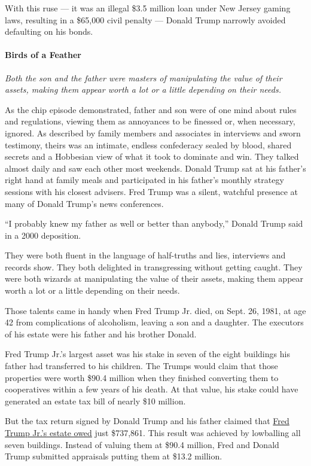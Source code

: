 With this ruse --- it was an illegal \$3.5 million loan under New Jersey
gaming laws, resulting in a \$65,000 civil penalty --- Donald Trump
narrowly avoided defaulting on his bonds.

\hypertarget{birds-of-a-feather}{%
\paragraph{Birds of a Feather}\label{birds-of-a-feather}}

\emph{Both the son and the father were masters of manipulating the value
of their assets, making them appear worth a lot or a little depending on
their needs.}

As the chip episode demonstrated, father and son were of one mind about
rules and regulations, viewing them as annoyances to be finessed or,
when necessary, ignored. As described by family members and associates
in interviews and sworn testimony, theirs was an intimate, endless
confederacy sealed by blood, shared secrets and a Hobbesian view of what
it took to dominate and win. They talked almost daily and saw each other
most weekends. Donald Trump sat at his father's right hand at family
meals and participated in his father's monthly strategy sessions with
his closest advisers. Fred Trump was a silent, watchful presence at many
of Donald Trump's news conferences.

``I probably knew my father as well or better than anybody,'' Donald
Trump said in a 2000 deposition.

They were both fluent in the language of half-truths and lies,
interviews and records show. They both delighted in transgressing
without getting caught. They were both wizards at manipulating the value
of their assets, making them appear worth a lot or a little depending on
their needs.

Those talents came in handy when Fred Trump Jr. died, on Sept. 26, 1981,
at age 42 from complications of alcoholism, leaving a son and a
daughter. The executors of his estate were his father and his brother
Donald.

Fred Trump Jr.'s largest asset was his stake in seven of the eight
buildings his father had transferred to his children. The Trumps would
claim that those properties were worth \$90.4 million when they finished
converting them to cooperatives within a few years of his death. At that
value, his stake could have generated an estate tax bill of nearly \$10
million.

But the tax return signed by Donald Trump and his father claimed that
\href{https://int.graylady3jvrrxbe.onion/data/documenthelper/339-fred-jr-1981-estate-tax-return/2ed81084d70858cfbb17/optimized/full.pdf\#page=1}{Fred
Trump Jr.'s estate owed} just \$737,861. This result was achieved by
lowballing all seven buildings. Instead of valuing them at \$90.4
million, Fred and Donald Trump submitted appraisals putting them at
\$13.2 million.

